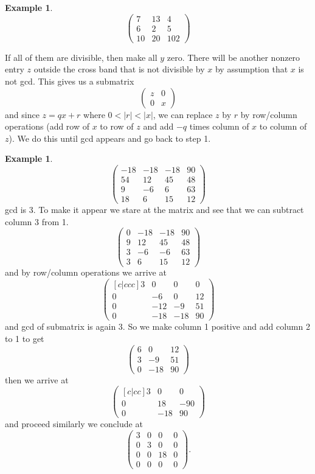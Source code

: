 \documentclass[a4paper]{article}
\theoremstyle{definition}
\newtheorem{example}[defn]{Example}
\begin{document}
\begin{enumerate}
\begin{example}
\[
\begin{pmatrix}
    7 & 13 & 4\\ 6 & 2 & 5 \\ 10 & 20 & 102
\end{pmatrix}
\]
\end{example}
If all of them are divisible, then make all $y$ zero. There will be another nonzero entry $z$ outside the cross band that is not divisible by $x$ by assumption that $x$ is not gcd. This gives us a submatrix
\[
\begin{pmatrix}
    z & 0 \\ 0 & x
\end{pmatrix}
\]
and since $z=qx+r$ where $0<|r|<|x|$, we can replace $z$ by $r$ by row/column operations (add row of $x$ to row of $z$ and add $-q$ times column of $x$ to column of $z$). We do this until gcd appears and go back to step 1.
\end{enumerate}

\begin{example}
\[
\begin{pmatrix}
-18 & -18 & -18 & 90 \\
54 & 12 & 45 & 48 \\
9 & -6 & 6 & 63 \\
18 & 6 & 15 & 12
\end{pmatrix}
\]
gcd is 3. To make it appear we stare at the matrix and see that we can subtract column 3 from 1.
\[
\begin{pmatrix}
0 & -18 & -18 & 90 \\
9 & 12 & 45 & 48 \\
3 & -6 & -6 & 63 \\
3 & 6 & 15 & 12
\end{pmatrix}
\]
and by row/column operations we arrive at
\[
\begin{pmatrix}[c|ccc]
3 & 0 & 0 & 0 \\ \hline
0 & -6 & 0 & 12\\
0 & -12 & -9 & 51 \\
0 & -18 & -18 & 90
\end{pmatrix}
\]
and gcd of submatrix is again 3. So we make column 1 positive and add column 2 to 1 to get
\[
\begin{pmatrix}
6 & 0 & 12 \\
3 & -9 & 51 \\
0 & -18 & 90
\end{pmatrix}
\]
then we arrive at 
\[
\begin{pmatrix}[c|cc]
3 & 0 & 0\\ \hline
0 & 18 & -90 \\
0 & -18 & 90
\end{pmatrix}
\]
and proceed similarly we conclude at
\[
\begin{pmatrix}
3 & 0 & 0 & 0\\
0 & 3 & 0 & 0\\
0 & 0 & 18 & 0 \\
0 & 0 & 0 & 0
\end{pmatrix} .
\]
\end{example}
\end{document}
